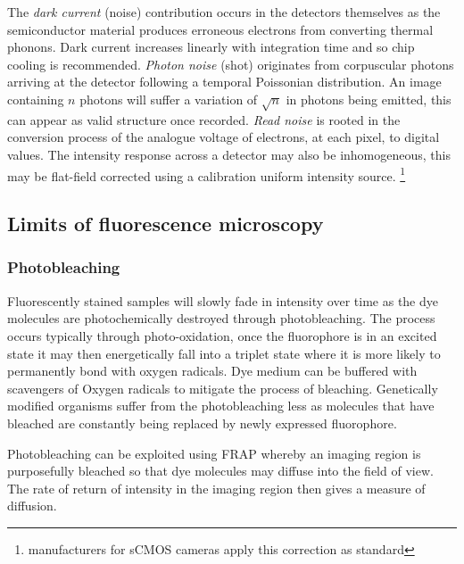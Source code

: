 The \emph{dark current} (noise) contribution occurs in the detectors themselves as the semiconductor material produces erroneous electrons from converting thermal phonons.
Dark current increases linearly with integration time and so chip cooling is recommended. \emph{Photon noise} (shot) originates from corpuscular photons arriving at the detector following a temporal Poissonian distribution.
An image containing $n$ photons will suffer a variation of $\sqrt{n}$ in photons being emitted, this can appear as valid structure once recorded. \emph{Read noise} is rooted in the conversion process of the analogue voltage of electrons, at each pixel, to digital values.
The intensity response across a detector may also be inhomogeneous, this may be flat-field corrected using a calibration uniform intensity source.
\footnote{manufacturers for sCMOS cameras apply this correction as standard}

\subsection{Limits of fluorescence microscopy}



\subsubsection{Photobleaching}

Fluorescently stained samples will slowly fade in intensity over time as the dye molecules are photochemically destroyed through photobleaching.
The process occurs typically through photo-oxidation, once the fluorophore is in an excited state it may then energetically fall into a triplet state where it is more likely to permanently bond with oxygen radicals.
Dye medium can be buffered with scavengers of Oxygen radicals to mitigate the process of bleaching.
Genetically modified organisms suffer from the photobleaching less as molecules that have bleached are constantly being replaced by newly expressed fluorophore.

Photobleaching can be exploited using FRAP whereby an imaging region is purposefully bleached so that dye molecules may diffuse into the field of view.
The rate of return of intensity in the imaging region then gives a measure of diffusion.




